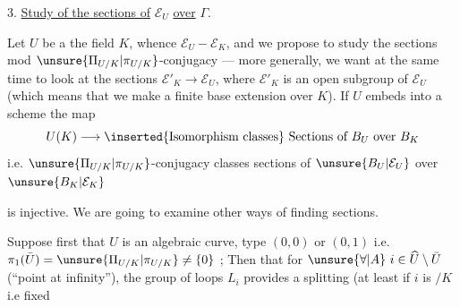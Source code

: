 3. \uline{Study of the sections of} $\mathcal{E}_U$ \uline{over} $\Gamma$.

Let $U$ be a   the field $K$, whence $\mathcal{E}_U-\mathcal{E}_K$, and we propose to study the sections mod $\unsure{\Pi_{U/K}|\pi_{U/K}}$-conjugacy --- more generally, we want at the same time to look at the sections $\mathcal{E}'_K\longrightarrow\mathcal{E}_U$, where $\mathcal{E}'_K$ is an open subgroup of $\mathcal{E}_U$ (which means that we make a finite base extension over $K$). If  $U$ embeds into a  scheme  the map
\[
U(K)\longrightarrow \inserted{\text{Isomorphism classes}}\ \text{Sections of }B_U\text{ over }B_K
\]
i.e. $\unsure{\Pi_{U/K}|\pi_{U/K}}$-conjugacy classes  sections of $\unsure{B_U|\mathcal{E}_U}$ over $\unsure{B_K|\mathcal{E}_K}$

is injective. We are going to examine other  ways of finding sections.

Suppose first that $U$ is an algebraic curve,   type $(0,0)$ or $(0,1)$ i.e. $\pi_1(\bar U)=\unsure{\Pi_{U/K}|\pi_{U/K}}\ne\{0\}$ ; Then  that for $\unsure{\forall|A}\ i\in\widehat U\setminus\bar U$ (``point at infinity''), the group of loops $L_i$ provides a splitting (at least if $i$ is $/K$ i.e fixed

